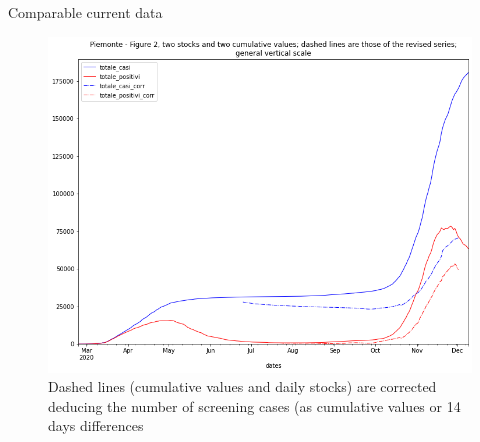 \documentclass[8pt]{beamer}
\begin{document}
\begin{frame}{Comparable current data}

\begin{figure}[H]
\center
\includegraphics[scale=0.26]{comparableCurrent2.png}

\caption{Dashed lines (cumulative values and daily stocks) are corrected deducing the number of screening cases (as cumulative values or 14 days differences} 
\label{comparableCurrent}
\end{figure}

\end{frame}
\end{document}
